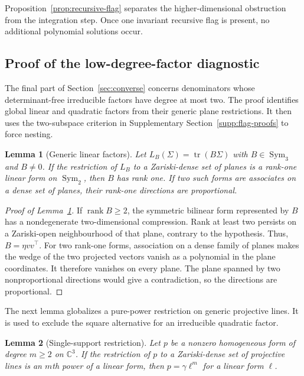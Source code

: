 \documentclass[12pt,a4paper]{article}
\theoremstyle{plain}
\newtheorem{lemma}{Lemma}
\theoremstyle{definition}
\newcommand{\C}{\mathbb{C}}
\newcommand{\Sym}{\operatorname{Sym}}
\newcommand{\tr}{\operatorname{tr}}
\newcommand{\rank}{\operatorname{rank}}
\begin{document}
Proposition~\ref{prop:recursive-flag} separates the higher-dimensional obstruction from the integration step.
Once one invariant recursive flag is present, no additional polynomial solutions occur.

\subsection{Proof of the low-degree-factor diagnostic}
\label{supp:low-degree-diagnostic}

The final part of Section~\ref{sec:converse} concerns denominators whose determinant-free irreducible factors have degree at most two.
The proof identifies global linear and quadratic factors from their generic plane restrictions.
It then uses the two-subspace criterion in Supplementary Section~\ref{supp:flag-proofs} to force nesting.

\begin{lemma}[Generic linear factors]
\label{lem:generic-linear-factor}
    Let $L_B(\Sigma)=\tr(B\Sigma)$ with $B\in\Sym_3$ and $B\ne0$.
    If the restriction of $L_B$ to a Zariski-dense set of planes is a rank-one linear form on $\Sym_2$, then $B$ has rank one.
    If two such forms are associates on a dense set of planes, their rank-one directions are proportional.
\end{lemma}

\begin{proof}[Proof of Lemma~\ref{lem:generic-linear-factor}]
    If $\rank B\ge2$, the symmetric bilinear form represented by $B$ has a nondegenerate two-dimensional compression.
    Rank at least two persists on a Zariski-open neighbourhood of that plane, contrary to the hypothesis.
    Thus, $B=\eta vv^\top$.
    For two rank-one forms, association on a dense family of planes makes the wedge of the two projected vectors vanish as a polynomial in the plane coordinates.
    It therefore vanishes on every plane.
    The plane spanned by two nonproportional directions would give a contradiction, so the directions are proportional.
\end{proof}

The next lemma globalizes a pure-power restriction on generic projective lines.
It is used to exclude the square alternative for an irreducible quadratic factor.

\begin{lemma}[Single-support restriction]
\label{lem:single-support}
    Let $p$ be a nonzero homogeneous form of degree $m\ge2$ on $\C^3$.
    If the restriction of $p$ to a Zariski-dense set of projective lines is an $m$th power of a linear form, then $p=\gamma\ell^m$ for a linear form $\ell$.
\end{lemma}
\end{document}
